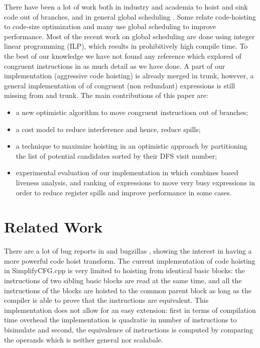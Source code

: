 \documentclass[acmlarge,review,anonymous]{acmart}\settopmatter{printfolios=true}
\begin{document}
There have been a lot of work both in industry and academia to hoist and sink
code out of branches, and in general global scheduling
\cite{click1995global}. Some relate code-hoisting to code-size optimization
\cite{rosen1988global} and many \cite{barany2013, shobaki2013} use global
scheduling to improve performance. Most of the recent work on global scheduling
are done using integer linear programming (ILP), which results in prohibitively
high compile time. To the best of our knowledge we have not found any reference
which explored \gcm{} of congruent instructions in as much detail as we
have done. A part of our implementation (aggressive code hoisting) is already
merged in \LLVM{} trunk, however, a general implementation of \gcm{} of
congruent (non redundant) expressions is still missing from \GCC{} and \LLVM{}
trunk. The main contributions of this paper are:
\begin{itemize}
\item a new optimistic algorithm to move congruent instructiosn out of branches;
\item a cost model to reduce interference and hence, reduce spills;
\item a technique to maximize hoisting in an optimistic approach by partitioning
  the list of potential candidates sorted by their DFS visit number;
\item experimental evaluation of our implementation in \LLVM{} which combines
  \SSA{} based liveness analysis, and ranking of expressions to move very busy
  expressions in order to reduce register spills and improve performance in some
  cases.
\end{itemize}

\section{Related Work}

There are a lot of bug reports in \GCC{} and \LLVM{} bugzillas
\cite{GCCCodeHoistingBugs, LLVMCodeHoistingBugs}, showing the interest in having
a more powerful code hoist transform.  The current \LLVM{} implementation of
code hoisting in SimplifyCFG.cpp is very limited to hoisting from identical
basic blocks: the instructions of two sibling basic blocks are read at the same
time, and all the instructions of the blocks are hoisted to the common parent
block as long as the compiler is able to prove that the instructions are
equivalent.  This implementation does not allow for an easy extension: first in
terms of compilation time overhead the implementation is quadratic in number of
instructions to bisimulate and second, the equivalence of instructions is
computed by comparing the operands which is neither general nor scalabale.
\end{document}
